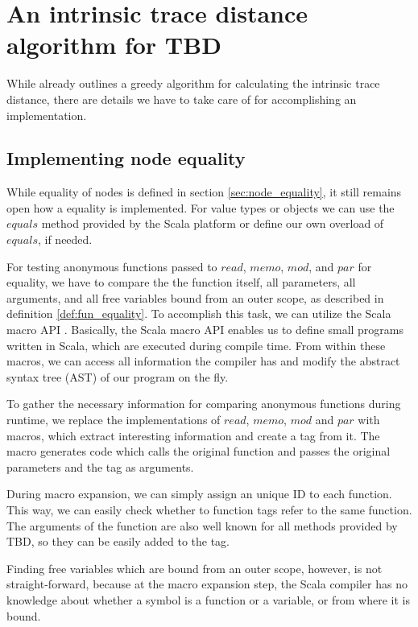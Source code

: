 \section{An intrinsic trace distance algorithm for TBD}
While \cite{Acar2005thesis} already outlines a greedy algorithm for calculating the intrinsic trace distance, there are details we have to take care of for accomplishing an implementation.

\subsection{Implementing node equality}
While equality of nodes is defined in section \ref{sec:node_equality}, it still remains open how a equality is implemented. For value types or objects we can use the $equals$ method provided by the Scala platform or define our own overload of $equals$, if needed.  

For testing anonymous functions passed to $read$, $memo$, $mod$, and $par$ for equality, we have to compare the the function itself, all parameters, all arguments, and all free variables bound from an outer scope, as described in definition \ref{def:fun_equality}. To accomplish this task, we can utilize the Scala macro API \cite{burmako2013scala}. Basically, the Scala macro API enables us to define small programs written in Scala, which are executed during compile time. From within these macros, we can access all information the compiler has and modify the abstract syntax tree (AST) of our program on the fly. 

To gather the necessary information for comparing anonymous functions during runtime, we replace the implementations of $read$, $memo$, $mod$ and $par$ with macros, which extract interesting information and create a tag from it. The macro generates code which calls the original function and passes the original parameters and the tag as arguments. 

During macro expansion, we can simply assign an unique ID to each function. This way, we can easily check whether to function tags refer to the same function. The arguments of the function are also well known for all methods provided by TBD, so they can be easily added to the tag. 

Finding free variables which are bound from an outer scope, however, is not straight-forward, because at the macro expansion step, the Scala compiler has no knowledge about whether a symbol is a function or a variable, or from where it is bound.

